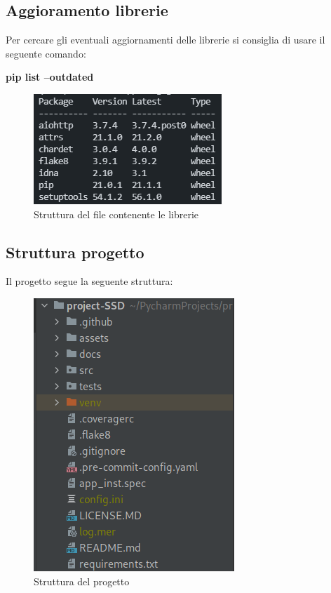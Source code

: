 \subsection{Aggioramento librerie}
Per cercare gli eventuali aggiornamenti delle librerie si consiglia di usare il seguente comando:
\newline{}\centerline{\textbf{pip list --outdated}}\newline{}
\begin{figure}[H]
    \centering
    \includegraphics[scale = 0.7]{components/img/requirements_updates.png}
    \caption{Struttura del file contenente le librerie}
    \label{fig:Lista di aggiornamenti disponibili per le librerie}
\end{figure}

\subsection{Struttura progetto}
Il progetto segue la seguente struttura:
\begin{figure}[H]
    \centering
    \includegraphics[scale = 0.5]{components/img/struttura-cartella-ssd.png}
    \caption{Struttura del progetto}
    \label{fig:Struttura del progetto}
\end{figure}  
